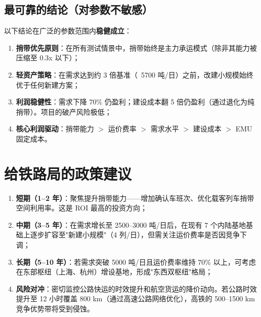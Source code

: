 \documentclass[12pt,a4paper,fontset=none]{ctexart}
\begin{document}
\subsection{最可靠的结论（对参数不敏感）}

以下结论在广泛的参数范围内\textbf{稳健成立}：

\begin{enumerate}[leftmargin=*]
    \item \textbf{捎带优先原则}：在所有测试情景中，捎带始终是主力承运模式（除非其能力被压缩至 0.3x 以下）；
    \item \textbf{轻资产策略}：在需求达到约 3 倍基准（~5700 吨/日）之前，改建小规模始终优于任何新建方案；
    \item \textbf{利润稳健性}：需求下降 70\% 仍盈利；建设成本翻 5 倍仍盈利（通过退化为纯捎带）。项目的破产风险极低；
    \item \textbf{核心利润驱动}：捎带能力 $>$ 运价费率 $>$ 需求水平 $>$ 建设成本 $>$ EMU 固定成本。
\end{enumerate}

\section{给铁路局的政策建议}

\begin{enumerate}[leftmargin=*]
    \item \textbf{短期（1--2 年）}：聚焦提升捎带能力——增加确认车班次、优化载客列车捎带空间利用率。这是 ROI 最高的投资方向；
    \item \textbf{中期（3--5 年）}：在需求增长至 2500--3000 吨/日后，在现有 7 个内陆基地基础上逐步扩容至"新建小规模"（4 列/日），但需关注运价费率是否因竞争下调；
    \item \textbf{长期（5--10 年）}：若需求突破 5000 吨/日且运价费率维持 70\% 以上，可考虑在东部枢纽（上海、杭州）增设基地，形成"东西双枢纽"格局；
    \item \textbf{风险对冲}：密切监控公路快运的时效提升和航空货运的降价动向。若公路时效提升至 12 小时覆盖 800 km（通过高速公路网络优化），高铁的 500--1500 km 竞争优势带将受到侵蚀。
\end{enumerate}
\end{document}
